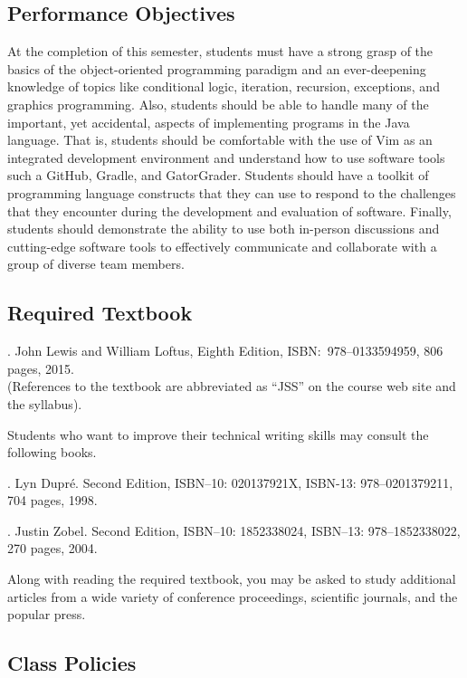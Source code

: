 \documentclass[11pt]{article}
\begin{document}
\subsection*{Performance Objectives}

At the completion of this semester, students must have a strong grasp of the basics of the object-oriented programming
paradigm and an ever-deepening knowledge of topics like conditional logic, iteration, recursion, exceptions, and
graphics programming. Also, students should be able to handle many of the important, yet accidental, aspects of
implementing programs in the Java language. That is, students should be comfortable with the use of Vim as an integrated
development environment and understand how to use software tools such a GitHub, Gradle, and GatorGrader. Students should
have a toolkit of programming language constructs that they can use to respond to the challenges that they encounter
during the development and evaluation of software. Finally, students should demonstrate the ability to use both
in-person discussions and cutting-edge software tools to effectively communicate and collaborate with a group of diverse
team members.

\subsection*{Required Textbook}

. John Lewis and William Loftus,
Eighth Edition, ISBN:\ 978--0133594959, 806 pages, 2015. \\
(References to the textbook are abbreviated as ``JSS'' on the course web site and the syllabus).

\noindent
Students who want to improve their technical writing skills may consult the following books.

. Lyn Dupr\'e. Second Edition,  ISBN--10: 020137921X,
ISBN-13: 978--0201379211, 704 pages, 1998.

.  Justin Zobel. Second Edition,  ISBN--10: 1852338024, ISBN--13:
978--1852338022, 270 pages, 2004.

\noindent Along with reading the required textbook, you may be asked to study additional articles from a wide variety of
conference proceedings, scientific journals, and the popular press.

\subsection*{Class Policies}
\end{document}
